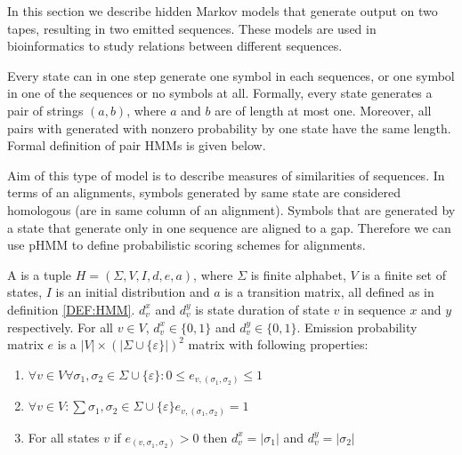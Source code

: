 In this section we  describe hidden Markov models that generate output on
two tapes, resulting in two emitted sequences. These models are used in
bioinformatics to study relations between different sequences.

Every state can in one step generate one symbol in each sequences, or one symbol
in one of the sequences or no symbols at all.
Formally, every state generates a pair of strings $(a,b)$, where $a$
and $b$ are of length at most one.
Moreover, all pairs with generated with nonzero probability by one state have
the same length.  Formal definition of pair HMMs is given below.

Aim of this type of model is to describe measures of similarities of sequences.
In terms of an alignments, symbols generated by same state are considered
homologous (are in same column of an alignment). Symbols that are generated by a
state that generate  only in one sequence are aligned to a gap. Therefore we can
use pHMM to define probabilistic scoring schemes for alignments.


\begin{definition}
A  is a tuple $H=(\Sigma,V,I,d,e,a)$, where $\Sigma$ is finite
alphabet, $V$ is a finite set of states, $I$ is an initial distribution and $a$ is
a transition matrix, all defined as
in definition \ref{DEF:HMM}. $d^x_v$ and $d^y_v$ is state duration of state $v$
in sequence $x$ and $y$ respectively. For all $v\in V$,
$d^x_v\in \{0,1\}$ and $d^y_v\in \{0,1\}$.
Emission probability matrix $e$ is
a $|V|\times\left(|\Sigma\cup\{\varepsilon\}|\right)^2$ matrix with following
properties:
\begin{enumerate}
\item
$\forall v\in V\forall \sigma_1,\sigma_2\in\Sigma\cup\{\varepsilon\}:
0\leq e_{v,(\sigma_1,\sigma_2)}\leq 1$

\item 
$\forall v\in V:
\sum {\sigma_1,\sigma_2\in\Sigma\cup\{\varepsilon\}}e_{v,(\sigma_1,\sigma_2)} = 1$

\item For all states $v$ if $e_{(v,\sigma_1,\sigma_2)}>0$ then
$d^x_v=|\sigma_1|$ and $d^y_v=|\sigma_2|$
\end{enumerate}

\end{definition}

